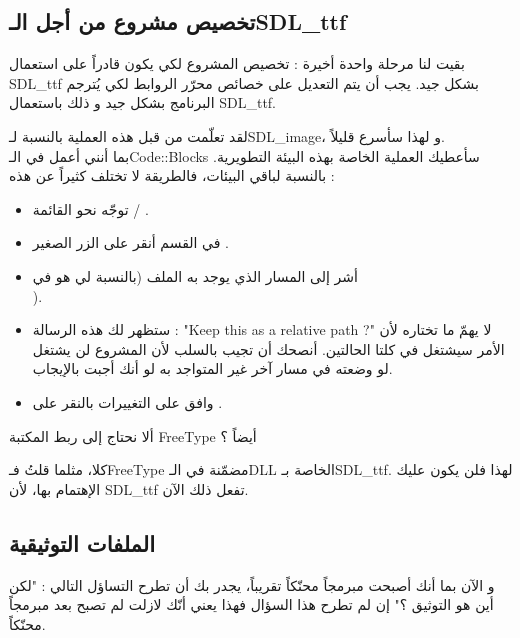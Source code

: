 \subsection{تخصيص مشروع من أجل الـ\textenglish{SDL\_ttf}}

بقيت لنا مرحلة واحدة أخيرة : تخصيص المشروع لكي يكون قادراً على استعمال
\textenglish{SDL\_ttf}
بشكل جيد. يجب أن يتم التعديل على خصائص محرّر الروابط لكي يُترجم البرنامج بشكل جيد و ذلك باستعمال
\textenglish{SDL\_ttf}.

لقد تعلّمت من قبل هذه العملية بالنسبة لـ\textenglish{SDL\_image}،
و لهذا سأسرع قليلاً. \\
بما أنني أعمل في الـ\textenglish{Code::Blocks}
سأعطيك العملية الخاصة بهذه البيئة التطويرية. بالنسبة لباقي البيئات، فالطريقة لا تختلف كثيراً عن هذه :

\begin{itemize}
	\item توجّه نحو القائمة
	 / .
	\item في القسم
	أنقر على الزر الصغير
	.
	\item أشر إلى المسار الذي يوجد به الملف
	(بالنسبة لي هو في\\
	).
	\item ستظهر لك هذه الرسالة :
	"\textenglish{Keep this as a relative path ?}"
	لا يهمّ ما تختاره لأن الأمر سيشتغل في كلتا الحالتين. أنصحك أن تجيب بالسلب لأن المشروع لن يشتغل لو وضعته في مسار آخر غير المتواجد به لو أنك أجبت بالإيجاب.
	\item وافق على التغييرات بالنقر على 
	.
\end{itemize}

\begin{question}
ألا نحتاج إلى ربط المكتبة
\textenglish{FreeType}
أيضاً ؟
\end{question}

كلا، مثلما قلتُ فـ\textenglish{FreeType}
مضمّنة في الـ\textenglish{DLL}
الخاصة بـ\textenglish{SDL\_ttf}.
لهذا فلن يكون عليك الإهتمام بها، لأن
\textenglish{SDL\_ttf}
تفعل ذلك الآن.
\subsection{الملفات التوثيقية}

و الآن بما أنك أصبحت مبرمجاً محنّكاً تقريباً، يجدر بك أن تطرح التساؤل التالي : "لكن أين هو التوثيق ؟" إن لم تطرح هذا السؤال فهذا يعني أنّك لازلت لم تصبح بعد مبرمجاً محنّكاً.

